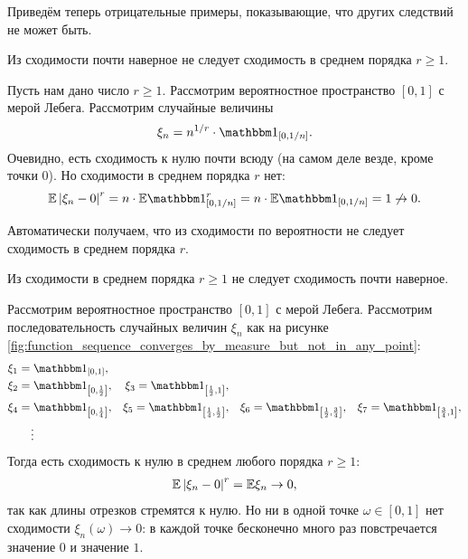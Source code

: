 \documentclass[../main.tex]{subfiles}
\begin{document}
Приведём теперь отрицательные примеры, показывающие, что других следствий не может быть.

\begin{exmpl}
 Из сходимости почти наверное не следует сходимость в среднем порядка $ r \geqslant 1 $.

 Пусть нам дано число $ r \geqslant 1 $. Рассмотрим вероятностное пространство $ [0,1] $ с мерой Лебега. Рассмотрим случайные величины
 \begin{align*}
  \xi_n = n^{1 / r} \cdot \Ind_{[0,1 / n]}.
 \end{align*} Очевидно, есть сходимость к нулю почти всюду (на самом деле везде, кроме точки $ 0 $). Но сходимости в среднем порядка $ r $ нет:
 \begin{align*}
  \E \left| \xi_n - 0 \right|^{r} = n \cdot \E\Ind_{[0, 1 / n]}^{r} = n \cdot \E\Ind_{[0,1 / n]} = 1 \not\rightarrow 0.
 \end{align*}
\end{exmpl}

Автоматически получаем, что из сходимости по вероятности не следует сходимость в среднем порядка $ r $.

\begin{exmpl}
 Из сходимости в среднем порядка $ r \geqslant 1 $ не следует сходимость почти наверное.

 Рассмотрим вероятностное пространство $ [0,1] $ с мерой Лебега. Рассмотрим последовательность случайных величин $\xi_n$ как на рисунке \ref{fig:function_sequence_converges_by_measure_but_not_in_any_point}: \begin{align*}
  &\xi_1 = \Ind_{\left[0,1\right]},\\
  &\xi_2 = \Ind_{\left[0, \frac{1}{2}\right]}, &\xi_3 = \Ind_{\left[ \frac{1}{2}, 1 \right]},\\
  &\xi_4 = \Ind_{\left[ 0,\frac{1}{4} \right]}, &\xi_5 = \Ind_{\left[ \frac{1}{4},\frac{1}{2} \right]}, &&\xi_6 = \Ind_{\left[ \frac{1}{2},\frac{3}{4} \right]}, &&\xi_7=\Ind_{\left[ \frac{3}{4},1 \right]}, \\
  &\qquad\vdots
 \end{align*}
 Тогда есть сходимость к нулю в среднем любого порядка $ r \geqslant 1 $:
 \begin{align*}
  \mathbb E \left| \xi_n - 0 \right|^{r} = \mathbb E \xi_n \to 0,
 \end{align*} так как длины отрезков стремятся к нулю. Но ни в одной точке $ \omega \in [0,1] $ нет сходимости $ \xi_n(\omega) \to 0 $: в каждой точке бесконечно много раз повстречается значение $ 0 $ и значение $ 1 $.
\end{exmpl}
\end{document}
